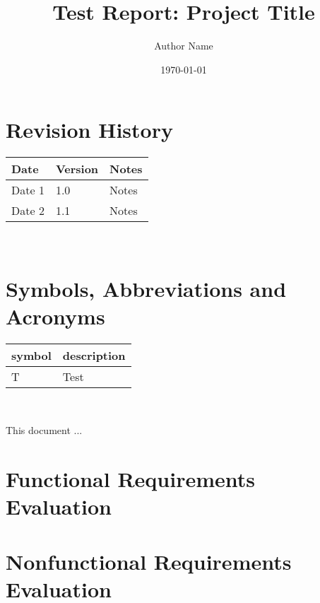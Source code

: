 \documentclass[12pt, titlepage]{article}
\begin{document}
\title{Test Report: Project Title} 
\author{Author Name}
\date{\today}
	
\maketitle


\section{Revision History}

\begin{tabularx}{\textwidth}{p{3cm}p{2cm}X}
\toprule {\bf Date} & {\bf Version} & {\bf Notes}\\
\midrule
Date 1 & 1.0 & Notes\\
Date 2 & 1.1 & Notes\\
\bottomrule
\end{tabularx}

~\newpage

\section{Symbols, Abbreviations and Acronyms}

\renewcommand{\arraystretch}{1.2}
\begin{tabular}{l l} 
  \toprule		
  \textbf{symbol} & \textbf{description}\\
  \midrule 
  T & Test\\
  \bottomrule
\end{tabular}\\


\newpage

\tableofcontents

\listoftables %

\listoffigures %

\newpage


This document ...

\section{Functional Requirements Evaluation}

\section{Nonfunctional Requirements Evaluation}
\end{document}
